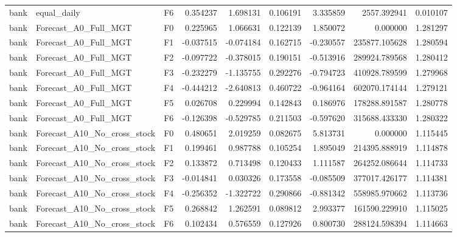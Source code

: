 \begin{tabular}{lllrrrrrr}
      bank &                  equal\_daily &  F6 &  0.354237 &  1.698131 & 0.106191 &  3.335859 &      2557.392941 &             0.010107 \\
      bank &         Forecast\_A0\_Full\_MGT &  F0 &  0.225965 &  1.066631 & 0.122139 &  1.850072 &         0.000000 &             1.281297 \\
      bank &         Forecast\_A0\_Full\_MGT &  F1 & -0.037515 & -0.074184 & 0.162715 & -0.230557 &    235877.105628 &             1.280594 \\
      bank &         Forecast\_A0\_Full\_MGT &  F2 & -0.097722 & -0.378015 & 0.190151 & -0.513916 &    289924.789568 &             1.280412 \\
      bank &         Forecast\_A0\_Full\_MGT &  F3 & -0.232279 & -1.135755 & 0.292276 & -0.794723 &    410928.789599 &             1.279968 \\
      bank &         Forecast\_A0\_Full\_MGT &  F4 & -0.444212 & -2.640813 & 0.460722 & -0.964164 &    602070.174144 &             1.279121 \\
      bank &         Forecast\_A0\_Full\_MGT &  F5 &  0.026708 &  0.229994 & 0.142843 &  0.186976 &    178288.891587 &             1.280778 \\
      bank &         Forecast\_A0\_Full\_MGT &  F6 & -0.126398 & -0.529785 & 0.211503 & -0.597620 &    315688.433330 &             1.280322 \\
      bank &  Forecast\_A10\_No\_cross\_stock &  F0 &  0.480651 &  2.019259 & 0.082675 &  5.813731 &         0.000000 &             1.115445 \\
      bank &  Forecast\_A10\_No\_cross\_stock &  F1 &  0.199461 &  0.987788 & 0.105254 &  1.895049 &    214395.888919 &             1.114878 \\
      bank &  Forecast\_A10\_No\_cross\_stock &  F2 &  0.133872 &  0.713498 & 0.120433 &  1.111587 &    264252.086644 &             1.114733 \\
      bank &  Forecast\_A10\_No\_cross\_stock &  F3 & -0.014841 &  0.030326 & 0.173558 & -0.085509 &    377017.426177 &             1.114381 \\
      bank &  Forecast\_A10\_No\_cross\_stock &  F4 & -0.256352 & -1.322722 & 0.290866 & -0.881342 &    558985.970662 &             1.113736 \\
      bank &  Forecast\_A10\_No\_cross\_stock &  F5 &  0.268842 &  1.262591 & 0.089812 &  2.993377 &    161590.229910 &             1.115025 \\
      bank &  Forecast\_A10\_No\_cross\_stock &  F6 &  0.102434 &  0.576559 & 0.127926 &  0.800730 &    288124.598394 &             1.114663 \\

\end{tabular}
